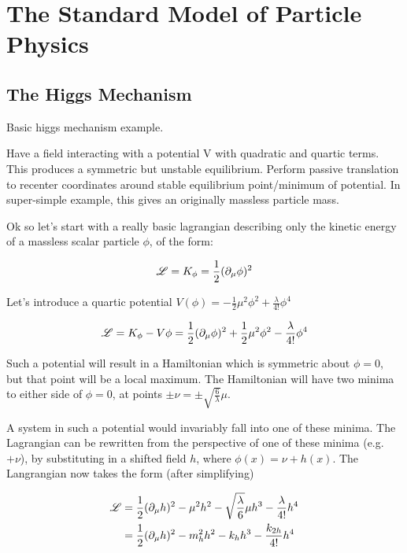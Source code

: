 \section{The Standard Model of Particle Physics}
    \subsection{The Higgs Mechanism}\label{sec:higgs_mechanism}

        Basic higgs mechanism example.

        Have a field interacting with a potential V with quadratic and quartic terms.
        This produces a symmetric but unstable equilibrium.
        Perform passive translation to recenter coordinates around stable equilibrium point/minimum of potential.
        In super-simple example, this gives an originally massless particle mass.

        Ok so let's start with a really basic lagrangian describing only the kinetic energy of a massless scalar particle $\phi$, of the form:

        \begin{equation}
            \mathscr{L} = K_{\phi} = \frac{1}{2} (\partial_{\mu} \phi)^2
        \end{equation}

        Let's introduce a quartic potential $V(\phi) = -\frac{1}{2} \mu^2 \phi^2 + \frac{\lambda}{4!} \phi^4$

        \begin{equation}
            \mathscr{L} = K_{\phi} - V{\phi} = \frac{1}{2} (\partial_{\mu} \phi)^2 
                +\frac{1}{2} \mu^2 \phi^2 - \frac{\lambda}{4!} \phi^4
        \end{equation}

        Such a potential will result in a Hamiltonian which is symmetric about $\phi=0$, but that point will be a local maximum.%
        The Hamiltonian will have two minima to either side of $\phi=0$, at points $\pm \nu = \pm \sqrt{\frac{6}{\lambda}} \mu$.

        A system in such a potential would invariably fall into one of these minima.
        The Lagrangian can be rewritten from the perspective of one of these minima (e.g.\ $+\nu$),
            by substituting in a shifted field $h$, where $\phi(x)=\nu+h(x)$.
        The Langrangian now takes the form (after simplifying)

        \begin{equation} \begin{split} \label{eq:basic_higgs}
            \mathscr{L} & = \frac{1}{2} (\partial_{\mu} h)^2
                - \mu^2 h^2
                -\sqrt{\frac{\lambda}{6}} \mu h^3
                - \frac{\lambda}{4!} h^4 \\
             & = \frac{1}{2} (\partial_{\mu} h)^2
                - m^2_{h} h^2
                - k_{h} h^3
                - \frac{k_{2h}}{4!} h^4
        \end{split} \end{equation} %

